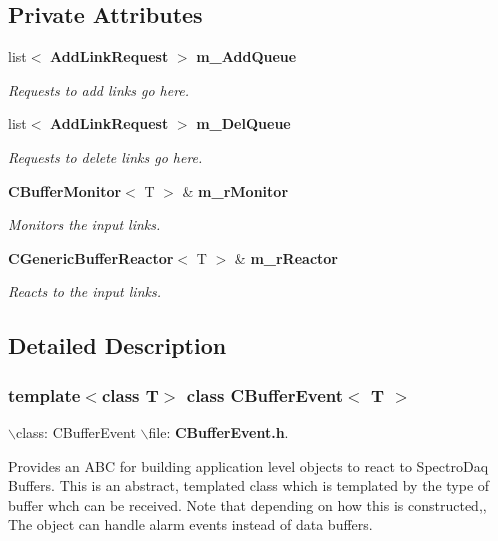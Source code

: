 \subsection*{Private Attributes}
\begin{CompactItemize}
\item 
list$<$ {\bf Add\-Link\-Request} $>$ {\bf m\_\-Add\-Queue}
\begin{CompactList}\small\item\em Requests to add links go here.\item\end{CompactList}\item 
list$<$ {\bf Add\-Link\-Request} $>$ {\bf m\_\-Del\-Queue}
\begin{CompactList}\small\item\em Requests to delete links go here.\item\end{CompactList}\item 
{\bf CBuffer\-Monitor}$<$ T $>$ \& {\bf m\_\-r\-Monitor}
\begin{CompactList}\small\item\em Monitors the input links.\item\end{CompactList}\item 
{\bf CGeneric\-Buffer\-Reactor}$<$ T $>$ \& {\bf m\_\-r\-Reactor}
\begin{CompactList}\small\item\em Reacts to the input links.\item\end{CompactList}\end{CompactItemize}


\subsection{Detailed Description}
\subsubsection*{template$<$class T$>$ class CBuffer\-Event$<$ T $>$}

$\backslash$class: CBuffer\-Event $\backslash$file: {\bf CBuffer\-Event.h}.

Provides an ABC for building application level objects to react to Spectro\-Daq Buffers. This is an abstract, templated class which is templated by the type of buffer whch can be received. Note that depending on how this is constructed,, The object can handle alarm events instead of data buffers. 



